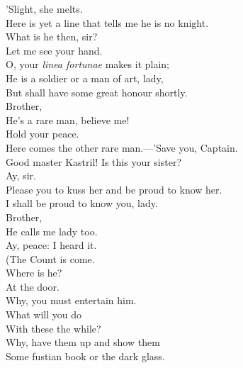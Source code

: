 \documentclass[a4paper,oneside,12pt]{memoir}
\begin{document}
\begin{drama*}
 'Slight, she melts.\\
Here is yet a line that tells me he is no knight.\\
\pliantspeaks What is he then, sir?\\
\subtlespeaks {} Let me see your hand.\\
O, your \emph{linea fortunae} makes it plain;\\
He is a soldier or a man of art, lady,\\
But shall have some great honour shortly.\\
\pliantspeaks {} Brother,\\
He's a rare man, believe me!\\
\kastrilspeaks {} Hold your peace.\\
Here comes the other rare man.---'Save you, Captain.\\
\facespeaks Good master Kastril! Is this your sister?\\
\kastrilspeaks {} Ay, sir.\\
Please you to kuss her and be proud to know her.\\
\facespeaks I shall be proud to know you, lady.\\
\pliantspeaks {} Brother,\\
He calls me lady too.\\
\kastrilspeaks {} Ay, peace: I heard it.\\
\facespeaks (The Count is come.\\
\subtlespeaks {} Where is he?\\
\facespeaks {} At the door.\\
\subtlespeaks Why, you must entertain him.\\
\facespeaks {} What will you do\\
With these the while?\\
\subtlespeaks {} Why, have them up and show them\\
Some fustian book or the dark glass.\\

\end{drama*}
\end{document}

